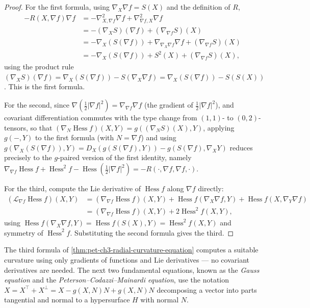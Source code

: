 \begin{proof}
  \leanok
  For the first formula, using $\nabla_X\nabla f=S(X)$ and the definition of $R$,
  \begin{align*}
    -R(X,\nabla f)\nabla f&=-\nabla^2_{X,\nabla f}\nabla f+\nabla^2_{\nabla f,X}\nabla f\\
    &=-(\nabla_XS)(\nabla f)+(\nabla_{\nabla f}S)(X)\\
    &=-\nabla_X(S(\nabla f))+\nabla_{\nabla_X\nabla f}\nabla f+(\nabla_{\nabla f}S)(X)\\
    &=-\nabla_X(S(\nabla f))+S^2(X)+(\nabla_{\nabla f}S)(X),
  \end{align*}
  using the product rule $(\nabla_XS)(\nabla f)=\nabla_X(S(\nabla f))-S(\nabla_X\nabla
  f)=\nabla_X(S(\nabla f))-S(S(X))$. This is the first formula.

  For the second, since $\nabla(\tfrac12|\nabla f|^2)=\nabla_{\nabla f}\nabla f$ (the
  gradient of $\tfrac12|\nabla f|^2$), and covariant differentiation commutes
  with the type change from $(1,1)$- to $(0,2)$-tensors, so that
  $(\nabla_N\operatorname{Hess}f)(X,Y)=g((\nabla_NS)(X),Y)$, applying $g(-,Y)$ to
  the first formula (with $N=\nabla f$) and using
  $g(\nabla_X(S(\nabla f)),Y)=D_X(g(S(\nabla f),Y))-g(S(\nabla f),\nabla_XY)$ reduces
  precisely to the $g$-paired version of the first identity, namely
  $\nabla_{\nabla f}\operatorname{Hess}f+\operatorname{Hess}^2f-\operatorname{Hess}(\tfrac12|\nabla
  f|^2)=-R(\cdot,\nabla f,\nabla f,\cdot)$.

  For the third, compute the Lie derivative of $\operatorname{Hess}f$ along
  $\nabla f$ directly:
  \begin{align*}
    (\mathcal L_{\nabla f}\operatorname{Hess}f)(X,Y)
    &=(\nabla_{\nabla f}\operatorname{Hess}f)(X,Y)+\operatorname{Hess}f(\nabla_X\nabla
    f,Y)+\operatorname{Hess}f(X,\nabla_Y\nabla f)\\
    &=(\nabla_{\nabla f}\operatorname{Hess}f)(X,Y)+2\operatorname{Hess}^2f(X,Y),
  \end{align*}
  using $\operatorname{Hess}f(\nabla_X\nabla f,Y)=\operatorname{Hess}f(S(X),Y)=\operatorname{Hess}^2f(X,Y)$
  and symmetry of $\operatorname{Hess}^2f$. Substituting the second formula gives the
  third.
\end{proof}

\begin{remark}
  \label{rem:pet-ch3-tangential-normal-decomposition}
  \leanok
  The third formula of \cref{thm:pet-ch3-radial-curvature-equation} computes a
  suitable curvature using only gradients of functions and Lie derivatives — no
  covariant derivatives are needed. The next two fundamental equations, known as
  the \emph{Gauss equation} and the \emph{Peterson--Codazzi--Mainardi equation},
  use the notation
  $X=X^\top+X^\perp=X-g(X,N)N+g(X,N)N$
  decomposing a vector into parts tangential and normal to a hypersurface $H$
  with normal $N$.
\end{remark}

